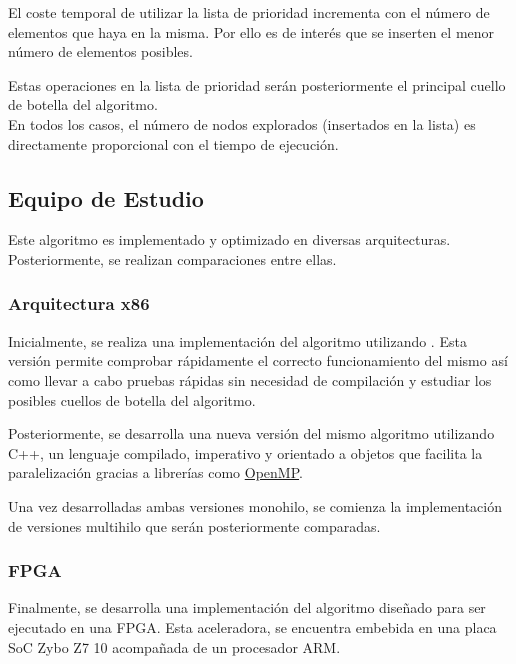 \begin{keynotebox}
    El coste temporal de utilizar la lista de prioridad
    incrementa con el número de elementos que haya en la misma.
    Por ello es de interés que se inserten el menor número de elementos posibles.

    Estas operaciones en la lista de prioridad serán posteriormente
    el principal cuello de botella del algoritmo.\\

    En todos los casos, el número de nodos explorados 
    (insertados en la lista)
    es directamente proporcional
    con el tiempo de ejecución.
\end{keynotebox}

\pagebreak

\subsection{Equipo de Estudio}

Este algoritmo es implementado y optimizado en diversas arquitecturas.
Posteriormente, se realizan comparaciones entre ellas.

\subsubsection{Arquitectura x86}

Inicialmente, se realiza una implementación del algoritmo utilizando \Python.
Esta versión permite comprobar rápidamente el correcto funcionamiento del mismo
así como llevar a cabo pruebas rápidas sin necesidad de compilación y
estudiar los posibles cuellos de botella del algoritmo.

Posteriormente, se desarrolla una nueva versión del mismo algoritmo
utilizando C++, un lenguaje compilado, imperativo y orientado a objetos
que facilita la paralelización gracias a librerías como 
\href{https://www.openmp.org/}{OpenMP}\@.

Una vez desarrolladas ambas versiones monohilo,
se comienza la implementación de versiones multihilo
que serán posteriormente comparadas.

\subsubsection{FPGA}

Finalmente, se desarrolla una implementación del algoritmo
diseñado para ser ejecutado en una FPGA\@.
Esta aceleradora, se encuentra embebida en una placa SoC
Zybo Z7 10 acompañada de un procesador ARM\@.

